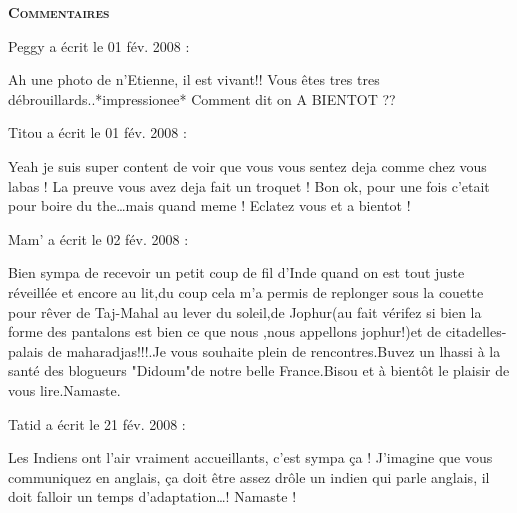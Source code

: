 \bigskip
\textbf{\textsc{Commentaires}}

\medskip
Peggy a écrit le 01 fév. 2008 :
\begin{displayquote}
Ah une photo de n'Etienne, il est vivant!!
Vous êtes tres tres débrouillards..*impressionee*
Comment dit on A BIENTOT ??
\end{displayquote}

\medskip
Titou a écrit le 01 fév. 2008 :
\begin{displayquote}
Yeah je suis super content de voir que vous vous sentez deja comme chez vous labas ! La preuve vous avez deja fait un troquet ! Bon ok, pour une fois c'etait pour boire du the\dots mais quand meme ! Eclatez vous et a bientot !
\end{displayquote}

\medskip
Mam' a écrit le 02 fév. 2008 :
\begin{displayquote}
Bien sympa de recevoir un petit coup de fil d'Inde quand on est tout juste réveillée et encore au lit,du coup cela m'a permis de replonger sous la couette pour rêver de Taj-Mahal au lever du soleil,de Jophur(au fait vérifez si bien la forme des pantalons est bien ce que nous ,nous appellons jophur!)et de citadelles-palais de maharadjas!!!.Je vous souhaite plein de rencontres.Buvez un lhassi
à la santé des blogueurs "Didoum"de notre belle France.Bisou et à bientôt le plaisir de vous lire.Namaste.
\end{displayquote}

\medskip
Tatid a écrit le 21 fév. 2008 :
\begin{displayquote}
Les Indiens ont l'air vraiment accueillants, c'est sympa ça ! J'imagine que vous communiquez en anglais, ça doit être assez drôle un indien qui parle anglais, il doit falloir un temps d'adaptation\dots !
Namaste !
\end{displayquote}

\vfill
